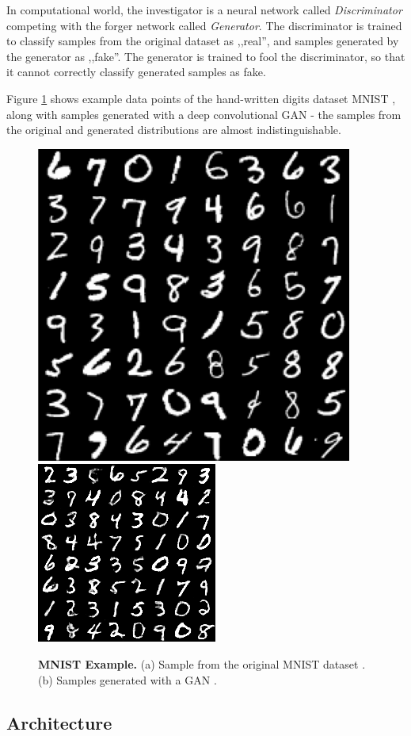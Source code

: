 \documentclass[12pt]{report}
\begin{document}
In computational world, the investigator is a neural network called \textit{Discriminator} competing with the forger network called \textit{Generator}. The discriminator is trained to classify samples from the original dataset as ,,real'', and samples generated by the generator as ,,fake''. The generator is trained to fool the discriminator, so that it cannot correctly classify generated samples as fake.

Figure \ref{fig:mnist} shows example data points of the hand-written digits dataset MNIST \cite{lecun_mnist_nodate}, along with samples generated with a deep convolutional GAN \cite{kim_dcgan-tensorflow_2018} - the samples from the original and generated distributions are almost indistinguishable.

\begin{figure}[h]
\centering
{}
{\includegraphics[width=.4\linewidth]{02_background/mnist_orig}}\hspace{0.5cm}
{\includegraphics[width=.4\linewidth]{02_background/mnist_dcgan}}
\caption{\label{fig:mnist} \textbf{MNIST Example.}
(a) Sample from the original MNIST dataset \cite{lecun_mnist_nodate}. (b) Samples generated with a GAN \cite{kim_dcgan-tensorflow_2018}.}
\end{figure}

\pagebreak
\subsection{Architecture}
\end{document}
